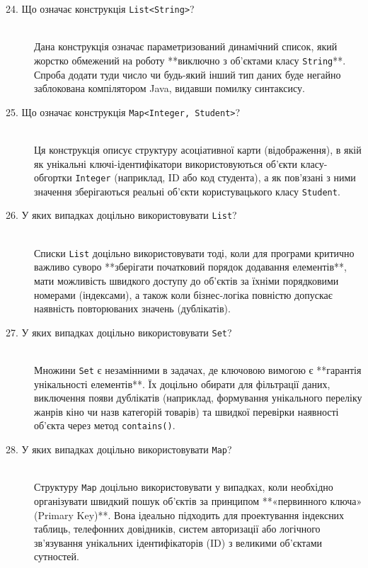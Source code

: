 \begin{description}
    \item[24. Що означає конструкція \texttt{List<String>}?] ~\\
    Дана конструкція означає параметризований динамічний список, який жорстко обмежений на роботу **виключно з об'єктами класу \texttt{String}**. Спроба додати туди число чи будь-який інший тип даних буде негайно заблокована компілятором Java, видавши помилку синтаксису.

    \item[25. Що означає конструкція \texttt{Map<Integer, Student>}?] ~\\
    Ця конструкція описує структуру асоціативної карти (відображення), в якій як унікальні ключі-ідентифікатори використовуються об'єкти класу-обгортки \texttt{Integer} (наприклад, ID або код студента), а як пов'язані з ними значення зберігаються реальні об'єкти користувацького класу \texttt{Student}.

    \item[26. У яких випадках доцільно використовувати \texttt{List}?] ~\\
    Списки \texttt{List} доцільно використовувати тоді, коли для програми критично важливо суворо **зберігати початковий порядок додавання елементів**, мати можливість швидкого доступу до об'єктів за їхніми порядковими номерами (індексами), а також коли бізнес-логіка повністю допускає наявність повторюваних значень (дублікатів).

    \item[27. У яких випадках доцільно використовувати \texttt{Set}?] ~\\
    Множини \texttt{Set} є незамінними в задачах, де ключовою вимогою є **гарантія унікальності елементів**. Їх доцільно обирати для фільтрації даних, виключення появи дублікатів (наприклад, формування унікального переліку жанрів кіно чи назв категорій товарів) та швидкої перевірки наявності об'єкта через метод \texttt{contains()}.

    \item[28. У яких випадках доцільно використовувати \texttt{Map}?] ~\\
    Структуру \texttt{Map} доцільно використовувати у випадках, коли необхідно організувати швидкий пошук об'єктів за принципом **«первинного ключа» (Primary Key)**. Вона ідеально підходить для проектування індексних таблиць, телефонних довідників, систем авторизації або логічного зв'язування унікальних ідентифікаторів (ID) з великими об'єктами сутностей.
\end{description}
